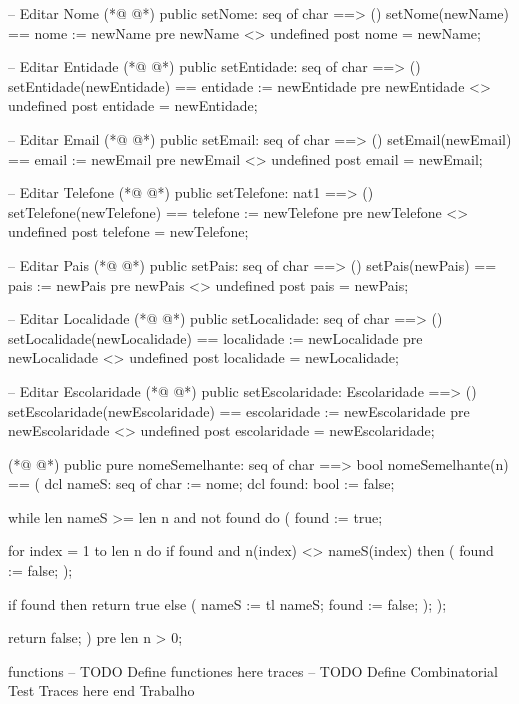 \begin{vdmpp}[breaklines=true]
 -- Editar Nome
(*@
\label{setNome:158}
@*)
 public setNome: seq of char ==> ()
 setNome(newName) == nome := newName
 pre newName <> undefined
 post nome = newName;
 
 -- Editar Entidade
(*@
\label{setEntidade:164}
@*)
 public setEntidade: seq of char ==> ()
 setEntidade(newEntidade) == entidade := newEntidade
 pre newEntidade <> undefined
 post entidade = newEntidade;
 
 -- Editar Email
(*@
\label{setEmail:170}
@*)
 public setEmail: seq of char ==> ()
 setEmail(newEmail) == email := newEmail
 pre newEmail <> undefined
 post email = newEmail;
 
 -- Editar Telefone
(*@
\label{setTelefone:176}
@*)
 public setTelefone: nat1 ==> ()
 setTelefone(newTelefone) == telefone := newTelefone
 pre newTelefone <> undefined
 post telefone = newTelefone;

 -- Editar Pais
(*@
\label{setPais:182}
@*)
 public setPais: seq of char ==> ()
 setPais(newPais) == pais := newPais
 pre newPais <> undefined
 post pais = newPais;
 
 -- Editar Localidade
(*@
\label{setLocalidade:188}
@*)
 public setLocalidade: seq of char ==> ()
 setLocalidade(newLocalidade) == localidade := newLocalidade
 pre newLocalidade <> undefined
 post localidade = newLocalidade;
 
 -- Editar Escolaridade
(*@
\label{setEscolaridade:194}
@*)
 public setEscolaridade: Escolaridade ==> ()
 setEscolaridade(newEscolaridade) == escolaridade := newEscolaridade
 pre newEscolaridade <> undefined
 post escolaridade = newEscolaridade;
 
(*@
\label{nomeSemelhante:199}
@*)
 public pure nomeSemelhante: seq of char ==> bool
 nomeSemelhante(n) == (
  dcl nameS: seq of char := nome;
  dcl found: bool := false;
  
  while len nameS >= len n and not found do (
   found := true;
 
   for index = 1 to len n do
    if found and n(index) <> nameS(index) then (
     found := false;
    );
   
   if found then
    return true
   else (
    nameS := tl nameS;
    found := false;
   );
  );
   
  return false;
 )
 pre len n > 0;
  
functions
-- TODO Define functiones here
traces
-- TODO Define Combinatorial Test Traces here
end Trabalho
\end{vdmpp}
\bigskip
